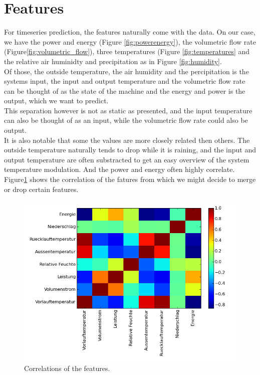 \documentclass{scrartcl}
\begin{document}
\section{Features}
For timeseries prediction, the features naturally come with the data. On our case, we have the power and energy (Figure \ref{fig:powerenergy}), the volumetric flow rate (Figure\ref{fig:volumetric_flow}), three temperatures (Figure \ref{fig:temperatures} and the relative air huminidty and precipitation as in Figure \ref{fig:humidity}.\\
Of those, the outside temperature, the air humidity and the percipitation is the systems input, the input and output temperature and the volumetric flow rate can be thought of as the state of the machine and the energy and power is the output, which we want to predict.\\
This separation however is not as static as presented, and the input temperature can also be thought of as an input, while the volumetric flow rate could also be output.\\
It is also notable that some the values are more closely related then others. The outside temperature naturally tends to drop while it is raining, and the input and output temperature are often substracted to get an easy overview of the system temperature modulation. And the power and energy often highly correlate. Figure\ref{fig:correlate} shows the correlation of the fatures from which we might decide to merge or drop certain features.

\begin{figure}[H]
  \centering
  \includegraphics[width=0.5\linewidth]{img/corrmatrix.png}
  \caption{Correlations of the features.}
  \label{fig:correlate}
\end{figure}
\end{document}
